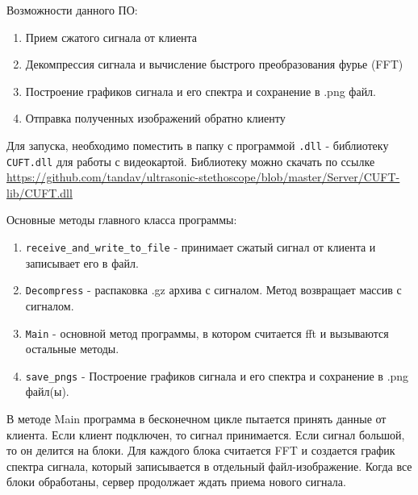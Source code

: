 \documentclass[../paper.tex]{subfiles}
\begin{document}
Возможности данного ПО:
\begin{enumerate}
  \item Прием сжатого сигнала от клиента
  \item Декомпрессия сигнала и вычисление быстрого преобразования фурье (FFT)
  \item Построение графиков сигнала и его спектра и сохранение в .png файл.
  \item Отправка полученных изображений обратно клиенту
\end{enumerate}

Для запуска, необходимо поместить в папку с программой \verb|.dll| - библиотеку \verb|CUFT.dll| для работы с видеокартой. Библиотеку можно скачать по ссылке \url{https://github.com/tandav/ultrasonic-stethoscope/blob/master/Server/CUFT-lib/CUFT.dll}

Основные методы главного класса программы:
\begin{enumerate}
  \item \verb|receive_and_write_to_file| - принимает сжатый сигнал от клиента и записывает его в файл.
  \item \verb|Decompress| - распаковка .gz архива с сигналом. Метод возвращает массив с сигналом.
  \item \verb|Main| - основной метод программы, в котором считается fft и вызываются остальные методы.
  \item \verb|save_pngs| - Построение графиков сигнала и его спектра и сохранение в .png файл(ы).
\end{enumerate}

В методе Main программа в бесконечном цикле пытается принять данные от клиента. Если клиент подключен, то сигнал принимается. Если сигнал большой, то он делится на блоки. Для каждого блока считается FFT и создается график спектра сигнала, который записывается в отдельный файл-изображение. Когда все блоки обработаны, сервер продолжает ждать приема нового сигнала.
\end{document}
